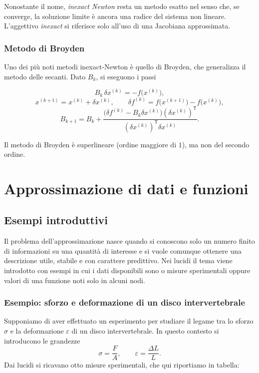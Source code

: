 \documentclass[11pt,a4paper]{report}
\newcommand{\trans}{^{\mathsf T}}
\begin{document}
\begin{noteBox}
Nonostante il nome, \emph{inexact Newton} resta un metodo esatto nel senso che, se converge, la soluzione limite \`e ancora una radice del sistema non lineare. L'aggettivo \emph{inexact} si riferisce solo all'uso di una Jacobiana approssimata.
\end{noteBox}

\subsection{Metodo di Broyden}
Uno dei pi\`u noti metodi inexact-Newton \`e quello di Broyden, che generalizza il metodo delle secanti.
Dato $B_k$, si eseguono i passi
\begin{formulaBox}
\[
 B_k\,\delta x^{(k)}=-f\bigl(x^{(k)}\bigr),
\]
\[
 x^{(k+1)}=x^{(k)}+\delta x^{(k)},
 \qquad
 \delta f^{(k)}=f\bigl(x^{(k+1)}\bigr)-f\bigl(x^{(k)}\bigr),
\]
\[
 B_{k+1}=B_k+
 \frac{\bigl(\delta f^{(k)}-B_k\delta x^{(k)}\bigr)(\delta x^{(k)})\trans}
 {(\delta x^{(k)})\trans\delta x^{(k)}}.
\]
\end{formulaBox}
Il metodo di Broyden \`e superlineare (ordine maggiore di $1$), ma non del secondo ordine.




\chapter{Approssimazione di dati e funzioni}

\section{Esempi introduttivi}
Il problema dell'approssimazione nasce quando si conoscono solo un numero finito di informazioni su una quantit\`a di interesse e si vuole comunque ottenere una descrizione utile, stabile e con carattere predittivo.
Nei lucidi il tema viene introdotto con esempi in cui i dati disponibili sono o misure sperimentali oppure valori di una funzione noti solo in alcuni nodi.

\subsection{Esempio: sforzo e deformazione di un disco intervertebrale}
Supponiamo di aver effettuato un esperimento per studiare il legame tra lo sforzo $\sigma$ e la deformazione $\varepsilon$ di un disco intervertebrale. In questo contesto si introducono le grandezze
\[
 \sigma=\frac{F}{A},
 \qquad
 \varepsilon=\frac{\Delta L}{L}.
\]
Dai lucidi si ricavano otto misure sperimentali, che qui riportiamo in tabella:
\end{document}
